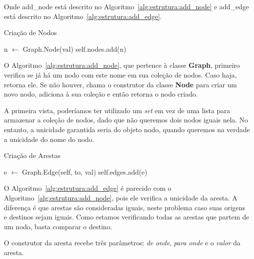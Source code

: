 \documentclass[12pt]{article}
\begin{document}
Onde \textsf{add\_node} está descrito no Algoritmo~\ref{alg:estrutura:add_node}
e \textsf{add\_edge} está descrito no Algoritmo~\ref{alg:estrutura:add_edge}.

\begin{algorithm}[H]
  \caption{Criação de Nodos}
  \label{alg:estrutura:add_node}
  {
    {
       
    }
    n $\gets$ Graph.Node(val) 
    self.nodes.add(n) 
  }
\end{algorithm}

O Algoritmo~\ref{alg:estrutura:add_node},
que pertence à classe \textsf{\textbf{Graph}}, primeiro verifica se já há um
nodo com este nome em sua coleção de nodos. Caso haja, retorna ele. Se não
houver, chama o construtor da classe \textsf{\textbf{Node}} para criar um novo
nodo, adiciona à sua coleção e então retorna o nodo criado.

A primeira vista, poderíamos ter utilizado um \textit{set} em vez de uma lista
para armazenar a coleção de nodos, dado que não queremos dois nodos iguais nela.
No entanto, a unicidade garantida seria do objeto nodo, quando queremos na
verdade a unicidade do nome do nodo.

\begin{algorithm}[H]
  \caption{Criação de Arestas}
  \label{alg:estrutura:add_edge}
  {
    {
       
    }
    e $\gets$ Graph.Edge(self, to, val) 
    self.edges.add(e) 
  }
\end{algorithm}

O Algoritmo~\ref{alg:estrutura:add_edge} é
parecido com o Algoritmo~\ref{alg:estrutura:add_node}, pois ele verifica a unicidade da
aresta. A diferença é que arestas são consideradas iguais, neste problema caso
suas origens e destinos sejam iguais. Como estamos verificando todas as arestas
que partem de um nodo, basta comparar o destino.

O construtor da aresta recebe três parâmetros: \textit{de onde}, \textit{para
  onde} e o \textit{valor} da aresta.
\end{document}
